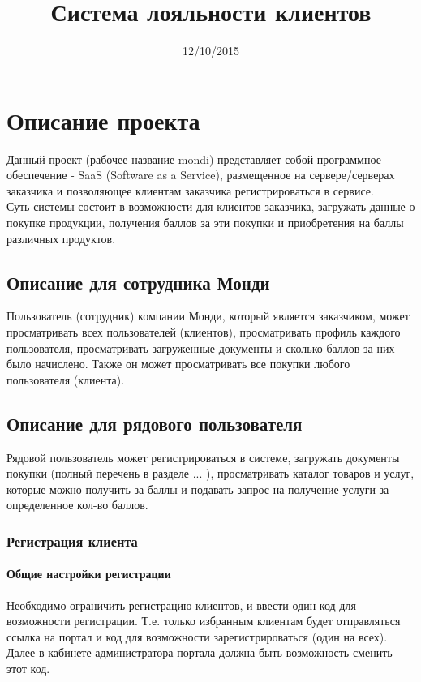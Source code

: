 \documentclass[DIV=calc, paper=a4, fontsize=11pt]{scrartcl} %
\title{Система лояльности клиентов}
\date{12/10/2015}
\begin{document}
\maketitle

\section{Описание проекта}

Данный проект (рабочее название mondi) представляет собой программное обеспечение - SaaS (Software as a Service), размещенное на сервере/серверах заказчика и позволяющее клиентам заказчика регистрироваться в сервисе. \\[0.5cm]
Суть системы состоит в возможности для клиентов заказчика, загружать данные о покупке продукции, получения баллов за эти покупки и приобретения на баллы различных продуктов.

\subsection{Описание для сотрудника Монди}
Пользователь (сотрудник) компании Монди, который является заказчиком, может просматривать всех пользователей (клиентов), просматривать профиль каждого пользователя, просматривать загруженные документы и сколько баллов за них было начислено. Также он может просматривать все покупки любого пользователя (клиента).

\subsection{Описание для рядового пользователя}
Рядовой пользователь может регистрироваться в системе, загружать документы покупки (полный перечень в разделе ... ), просматривать каталог товаров и услуг, которые можно получить за баллы и подавать запрос на получение услуги за определенное кол-во баллов.

\subsubsection{Регистрация клиента}

\paragraph{Общие настройки регистрации}
Необходимо ограничить регистрацию клиентов, и ввести один код для возможности регистрации. Т.е. только избранным клиентам будет отправляться ссылка на портал и код для возможности зарегистрироваться (один на всех). Далее в кабинете администратора портала должна быть возможность сменить этот код.
\end{document}
